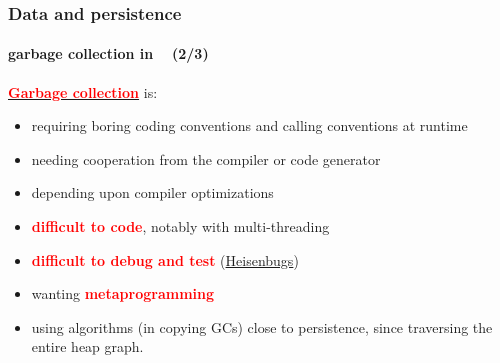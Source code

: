 \documentclass[xcolor=svgnames,final,smaller,a4]{beamer}
\begin{document}
\begin{frame}
    \frametitle{Data and persistence}
    \framesubtitle{garbage collection in \Bismon ~ (2/3)}
    
    {\href{http://gchandbook.org/}{\textcolor{red}{\textbf{Garbage
            collection}}}} is:
    
    \begin{itemize}

     \item requiring boring coding conventions and calling conventions at runtime

     \item needing cooperation from the compiler or code generator

     \item depending upon compiler optimizations

     \item {\textcolor{red}{\textbf{difficult to code}}}, notably with multi-threading

     \item {\textcolor{red}{\textbf{difficult to debug and test}}} (\href{https://en.wikipedia.org/wiki/Heisenbug}{Heisenbugs})


      
     \item wanting {\textcolor{red}{\textbf{metaprogramming}}} {}

          \item using algorithms (in copying GCs) close to
            persistence, since traversing the entire heap graph.
            
   \end{itemize}
   
\end{frame}
\end{document}

